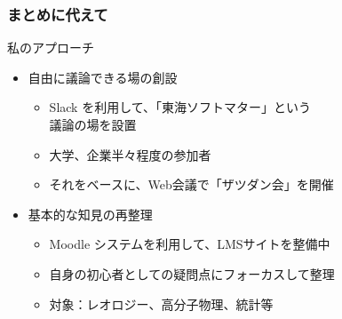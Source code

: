 \documentclass[12pt, dvipdfmx]{beamer}
\begin{document}
\begin{frame}
    \frametitle{まとめに代えて}
        \begin{exampleblock}{私のアプローチ}
            \begin{itemize}
                \item 自由に議論できる場の創設
                \begin{itemize}
                    \item Slack を利用して、「東海ソフトマター」という\\議論の場を設置
                    \item 大学、企業半々程度の参加者
                    \item それをベースに、Web会議で「ザツダン会」を開催
                \end{itemize}
                \item 基本的な知見の再整理
                \begin{itemize}
                    \item Moodle システムを利用して、LMSサイトを整備中
                    \item 自身の初心者としての疑問点にフォーカスして整理
                    \item 対象：レオロジー、高分子物理、統計等
                \end{itemize}
            \end{itemize}
        \end{exampleblock}
\end{frame}
\end{document}
